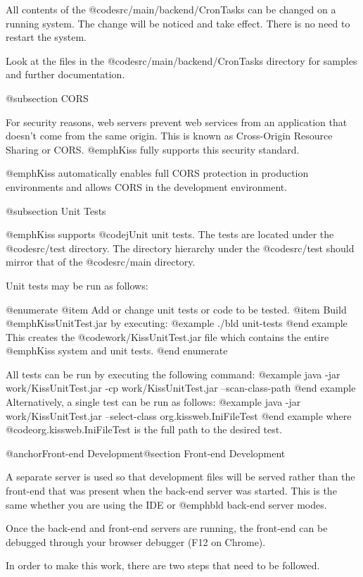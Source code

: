 All contents of the @code{src/main/backend/CronTasks} can be changed
on a running system.  The change will be noticed and take effect.
There is no need to restart the system.

Look at the files in the @code{src/main/backend/CronTasks}
directory for samples and further documentation.

@subsection CORS

For security reasons, web servers prevent web services from
an application that doesn't come from the same origin.  This is
known as Cross-Origin Resource Sharing or CORS.  @emph{Kiss} fully
supports this security standard. 

@emph{Kiss} automatically enables full CORS protection in production
environments and allows CORS in the development environment.

@subsection Unit Tests

@emph{Kiss} supports @code{jUnit} unit tests.  The tests are located
under the @code{src/test} directory.  The directory hierarchy under
the @code{src/test} should mirror that of the @code{src/main}
directory.

Unit tests may be run as follows:

@enumerate
@item
Add or change unit tests or code to be tested.
@item
Build @emph{KissUnitTest.jar} by executing:
@example
    ./bld unit-tests
@end example
This creates the @code{work/KissUnitTest.jar} file which contains
the entire @emph{Kiss} system and unit tests.
@end enumerate

All tests can be run by executing the following command:
@example
java -jar work/KissUnitTest.jar -cp work/KissUnitTest.jar 
                                                  --scan-class-path
@end example
Alternatively, a single test can be run as follows:
@example
java -jar work/KissUnitTest.jar --select-class org.kissweb.IniFileTest
@end example
where @code{org.kissweb.IniFileTest} is the full path to the desired test.

@anchor{Front-end Development}@section Front-end Development

A separate server is used so that development files will be served
rather than the front-end that was present when the back-end server
was started.  This is the same whether you are using the IDE or
@emph{bld} back-end server modes.

Once the back-end and front-end servers are running, the front-end can
be debugged through your browser debugger (F12 on Chrome).

In order to make this work, there are two steps that
need to be followed.

